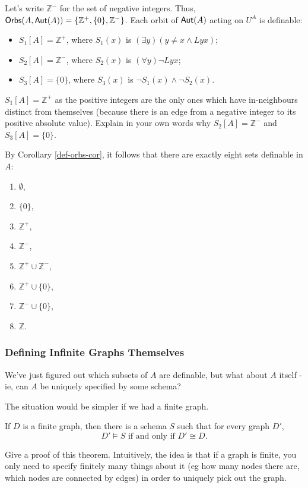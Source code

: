 Let's write $\mathbb{Z}^-$ for the set of negative integers. Thus, $\mbox{$\mathsf{Orbs}(A,\mbox{$\mathsf{Aut}(A)$})$}= \{\mathbb{Z}^+,\{0\},\mathbb{Z}^-\}$. Each orbit of $\mbox{$\mathsf{Aut}(A)$}$ acting on $U^A$ is definable:
\begin{itemize}
\item 
$S_1[A] = \mathbb{Z}^+$, where $S_1(x)$ is $(\exists y)(y\neq x \wedge Lyx)$;
\item 
$S_2[A] = \mathbb{Z}^-$, where $S_2(x)$ is $(\forall y)\neg Lyx$;
\item 
$S_3[A] = \{0\}$, where $S_3(x)$ is $\neg S_1(x)\wedge\neg S_2(x)$.
\end{itemize} 

\begin{aside}
    $S_1[A] = \mathbb{Z}^+$ as the positive integers are the only ones which have in-neighbours distinct from themselves (because there is an edge from a negative integer to its positive absolute value). Explain in your own words why $S_2[A] = \mathbb{Z}^-$ and $S_3[A] = \{0\}$. 
\end{aside}

By Corollary \ref{def-orbs-cor}, it follows that there are exactly eight sets definable in $A$:
\begin{enumerate}
\item $\emptyset$,
\item $\{0\}$,
\item $\mathbb{Z}^+$,
\item $\mathbb{Z}^-$,
\item $\mathbb{Z}^+\cup\mathbb{Z}^-$,
\item $\mathbb{Z}^+\cup\{0\}$,
\item $\mathbb{Z}^-\cup\{0\}$,
\item $\mathbb{Z}$.
\end{enumerate}
\iffalse
\subsubsection*{Defining Infinite Graphs Themselves}
We've just figured out which subsets of $A$ are definable, but what about $A$ itself - ie, can $A$ be uniquely specified by some schema?

The situation would be simpler if we had a finite graph.
\begin{theorem}
If $D$ is a finite graph, then there is a schema $S$ such that for every graph $D'$, 
\[
D'\models S \mbox{ if and only if } D'\cong D.
\]
\end{theorem}

\begin{aside}
    Give a proof of this theorem. Intuitively, the idea is that if a graph is finite, you only need to specify finitely many things about it (eg how many nodes there are, which nodes are connected by edges) in order to uniquely pick out the graph. 
\end{aside}

